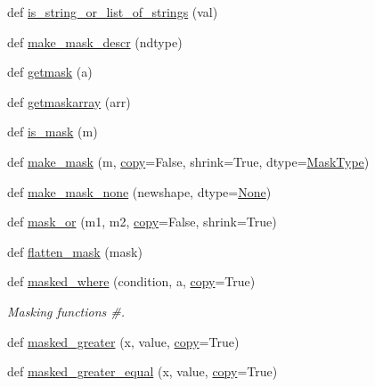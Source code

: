 \begin{DoxyCompactItemize}
\item 
def \hyperlink{namespacenumpy_1_1ma_1_1core_a9b70c4c2816e973d300f5577884ca7b8}{is\+\_\+string\+\_\+or\+\_\+list\+\_\+of\+\_\+strings} (val)
\item 
def \hyperlink{namespacenumpy_1_1ma_1_1core_a0e72c50a10bbb5bfb8ce855602a34c25}{make\+\_\+mask\+\_\+descr} (ndtype)
\item 
def \hyperlink{namespacenumpy_1_1ma_1_1core_ad114e63ad545adf2ed6243f8a4e87934}{getmask} (a)
\item 
def \hyperlink{namespacenumpy_1_1ma_1_1core_ab880e3722cf3efc5882510f15aa33b0c}{getmaskarray} (arr)
\item 
def \hyperlink{namespacenumpy_1_1ma_1_1core_a65e12c5ad1e1b9c898fafcc88a25c597}{is\+\_\+mask} (m)
\item 
def \hyperlink{namespacenumpy_1_1ma_1_1core_ae69f2f8cd3d14437f8e15810fe8be738}{make\+\_\+mask} (m, \hyperlink{namespacenumpy_1_1ma_1_1core_a9eadff0419a718d13488bd60175f825d}{copy}=False, shrink=True, dtype=\hyperlink{namespacenumpy_1_1ma_1_1core_acc6b89c85d288395d69165107e312c4e}{Mask\+Type})
\item 
def \hyperlink{namespacenumpy_1_1ma_1_1core_af085abf4131ef0c7aaa49098f8129cfd}{make\+\_\+mask\+\_\+none} (newshape, dtype=\hyperlink{namespacenumpy_1_1ma_1_1core_a647ee1848dfa3692fe35a663a2aa40b3}{None})
\item 
def \hyperlink{namespacenumpy_1_1ma_1_1core_aeba455fcb81bfb5d206db0606926b867}{mask\+\_\+or} (m1, m2, \hyperlink{namespacenumpy_1_1ma_1_1core_a9eadff0419a718d13488bd60175f825d}{copy}=False, shrink=True)
\item 
def \hyperlink{namespacenumpy_1_1ma_1_1core_a5c562e8b88bdd24c25ae41f0959fc262}{flatten\+\_\+mask} (mask)
\item 
def \hyperlink{namespacenumpy_1_1ma_1_1core_ac0e3a7db34bc11b3b4ca72a1b2702a7c}{masked\+\_\+where} (condition, a, \hyperlink{namespacenumpy_1_1ma_1_1core_a9eadff0419a718d13488bd60175f825d}{copy}=True)
\begin{DoxyCompactList}\small\item\em Masking functions \#. \end{DoxyCompactList}\item 
def \hyperlink{namespacenumpy_1_1ma_1_1core_a4d90775c8f21ae0945388a167c9bce72}{masked\+\_\+greater} (x, value, \hyperlink{namespacenumpy_1_1ma_1_1core_a9eadff0419a718d13488bd60175f825d}{copy}=True)
\item 
def \hyperlink{namespacenumpy_1_1ma_1_1core_a92f728fc2b2d69a7c856282d99dc97ec}{masked\+\_\+greater\+\_\+equal} (x, value, \hyperlink{namespacenumpy_1_1ma_1_1core_a9eadff0419a718d13488bd60175f825d}{copy}=True)

\end{DoxyCompactItemize}
